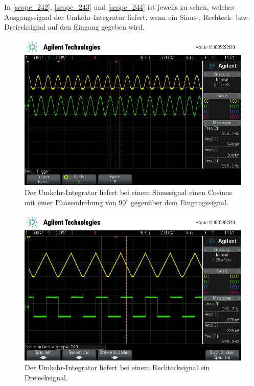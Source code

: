 In \autoref{scope_242}, \autoref{scope_243} und \autoref{scope_244} ist jeweils zu sehen, welches Ausgangssignal der Umkehr-Integrator liefert, wenn ein Sinus-, Rechteck- bzw. Dreiecksignal auf den Eingang gegeben wird.\begin{figure}[h]
	\centering
	\includegraphics[width=\textwidth]{usb/scope_242.png}
	\caption{Der Umkehr-Integrator liefert bei einem Sinussignal einen Cosinus mit einer Phasendrehung von $90^\circ$ gegenüber dem Eingangssignal.}
	\label{scope_242}
\end{figure}
\begin{figure}[h]
	\centering
	\includegraphics[width=\textwidth]{usb/scope_243.png}
	\caption{Der Umkehr-Integrator liefert bei einem Rechtecksignal ein Dreiecksignal.}
	\label{scope_243}
\end{figure}
